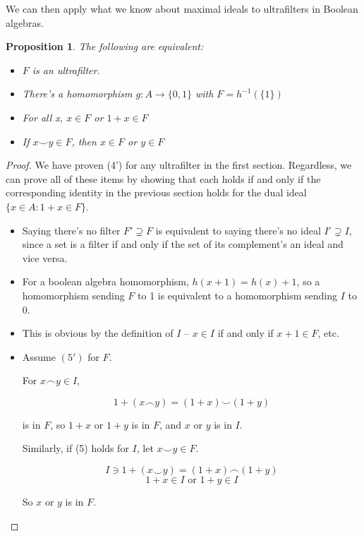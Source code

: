 \documentclass{article}
\newtheorem*{proposition}{Proposition}
\begin{document}
      We can then apply what we know about maximal ideals to ultrafilters in
      Boolean algebras.

      \begin{proposition}
        The following are equivalent:

        \begin{itemize}
          \item[(1')] $F$ is an ultrafilter.
          \item[(3')] There's a homomorphism $g: A \rightarrow \{0,1\}$ with $F
          = h^{-1}(\{1\})$
          \item[(4')] For all x, $x \in F$ or $1+x \in F$
          \item[(5')] If $x \smile y \in F$, then $x \in F$ or $y \in F$
        \end{itemize}
      \end{proposition}

      \begin{proof}

        We have proven (4') for any ultrafilter in the first section.
        Regardless, we can prove all of these items by showing that each holds
        if and only if the corresponding identity in the previous section holds
          for the dual ideal $\{x \in A: 1+x \in F\}$.

      \begin{itemize}[align = left]

        \item[(1')] Saying there's no filter $F' \supsetneq F$ is equivalent to
        saying there's no ideal $I' \supsetneq I$, since a set is a filter if
        and only if the set of its complement's an ideal and vice versa.

        \item[(3')] For a boolean algebra homomorphism, $h(x+1) = h(x) + 1$, so
        a homomorphism sending $F$ to 1 is equivalent to a homomorphism sending
        $I$ to 0.

        \item[(4')] This is obvious by the definition of $I$ -- $x \in I$ if and
        only if $x+1 \in F$, etc.

        \item[(5')] Assume $(5')$ for $F$.

          For $x \frown y \in I$,

          \[1 + (x \frown y) = (1+x) \smile (1+y)\]
          
          is in $F$, so $1+x$ or $1+y$ is in $F$, and $x$ or $y$ is in $I$.

          Similarly, if (5) holds for $I$, let $x \smile y\in F$.

          \[I \ni 1 + (x \smile y) = (1 + x) \frown (1 + y)\]
          \[1 + x \in I \text{ or } 1 + y \in I\]

          So $x$ or $y$ is in $F$.
        \end{itemize}
      \end{proof}
\end{document}
